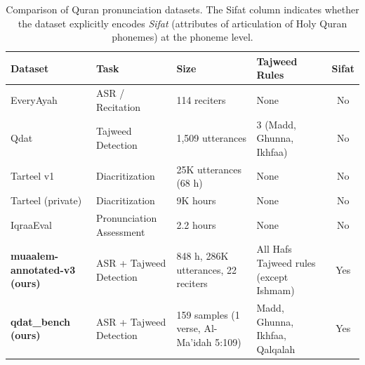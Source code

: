 \begin{table}[t]
	\centering
	\scriptsize
	\begin{tabular}{p{2.8cm} p{2.3cm} p{2.2cm} p{3.5cm} c}
		\toprule
		\textbf{Dataset}                                                                                                                       & \textbf{Task}            & \textbf{Size}                           & \textbf{Tajweed Rules}                 & \textbf{Sifat} \\
		\midrule
		EveryAyah                                                                                                                              & ASR / Recitation         & 114 reciters                            & None                                   & No             \\
		Qdat \cite{osman2021qdat}                                                                                                              & Tajweed Detection        & 1,509 utterances                        & 3 (Madd, Ghunna, Ikhfaa)               & No             \\
		Tarteel v1 \cite{khan2021tarteel}                                                                                                      & Diacritization           & 25K utterances (68 h)                   & None                                   & No             \\
		Tarteel (private)                                                                                                                      & Diacritization           & 9K hours                                & None                                   & No             \\
		IqraaEval \cite{kheir2025towards}                                                                                                      & Pronunciation Assessment & 2.2 hours                               & None                                   & No             \\
		\textbf{muaalem-annotated-v3 (ours)} & ASR + Tajweed Detection  & 848 h, 286K utterances, 22 reciters     & All Hafs Tajweed rules (except Ishmam) & Yes            \\  %
		\textbf{qdat\_bench (ours)}                                                  & ASR + Tajweed Detection        & 159 samples (1 verse, Al-Ma'idah 5:109) & Madd, Ghunna, Ikhfaa, Qalqalah         & Yes            \\  %
		\bottomrule
	\end{tabular}
	\caption{Comparison of Quran pronunciation datasets. The Sifat column indicates whether the dataset explicitly encodes \emph{Sifat} (attributes of articulation of Holy Quran phonemes) at the phoneme level.}
	\label{tab:datasets-comparison}
\end{table}


